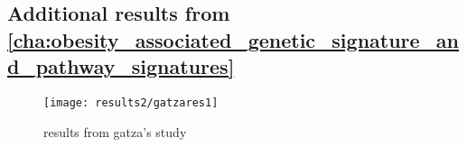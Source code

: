 \begin{appendices}
	\chapter{Additional results from \cref{cha:obesity_associated_genetic_signature_and_pathway_signatures}}
	\label{app:b}

	\begin{figure}[htpb]
		\centering
		\texttt{[image: results2/gatzares1]}
		\caption{results from gatza's study}
		\label{fig:gatza_paper_res}
	\end{figure}





\end{appendices}
